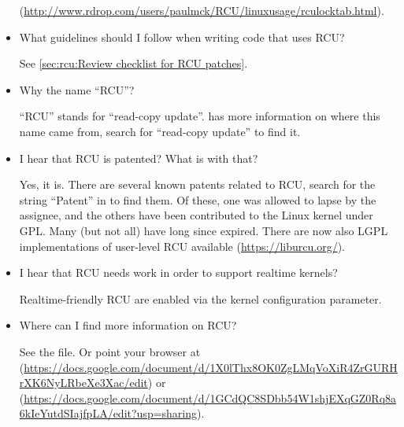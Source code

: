 \begin{itemize}
  (\url{http://www.rdrop.com/users/paulmck/RCU/linuxusage/rculocktab.html}).

\item What guidelines should I follow when writing code that uses RCU\@?

  See \cref{sec:rcu:Review checklist for RCU patches}.

\item Why the name ``RCU\@''?

  ``RCU'' stands for ``read-copy update''.
   has more information on where this name came from, search
  for ``read-copy update'' to find it.

\item I hear that RCU is patented?
  What is with that?

  Yes, it is.
  There are several known patents related to RCU,
  search for the string ``Patent'' in  to find them.
  Of these, one was allowed to lapse by the assignee, and the
  others have been contributed to the Linux kernel under GPL\@.
  Many (but not all) have long since expired.
  There are now also LGPL implementations of user-level RCU
  available (\url{https://liburcu.org/}).

\item I hear that RCU needs work in order to support realtime kernels?

  Realtime-friendly RCU are enabled via the 
  kernel configuration parameter.

\item Where can I find more information on RCU\@?

  See the  file.
  Or point your browser at (\url{https://docs.google.com/document/d/1X0lThx8OK0ZgLMqVoXiR4ZrGURHrXK6NyLRbeXe3Xac/edit})
  or (\url{https://docs.google.com/document/d/1GCdQC8SDbb54W1shjEXqGZ0Rq8a6kIeYutdSIajfpLA/edit?usp=sharing}).
\end{itemize}
